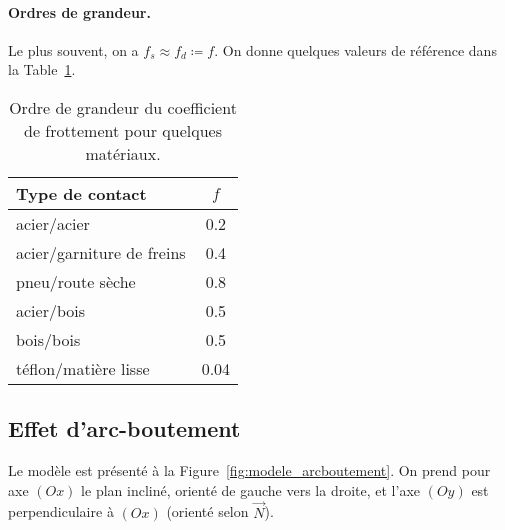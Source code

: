         \paragraph{Ordres de grandeur.} Le plus souvent, on a $f_s\approx f_d\coloneqq f$. On donne quelques valeurs de référence dans la Table~\ref{tab:odg_frottement_materiau}.

        \begin{table}
            \centering
            \begin{tabular}{l|c}
                \toprule
                Type de contact & $f$ \\ \midrule
                acier/acier & 0.2\\ \midrule
                acier/garniture de freins & 0.4\\ \midrule
                pneu/route sèche & 0.8\\ \midrule
                acier/bois & 0.5\\ \midrule
                bois/bois & 0.5\\ \midrule
                téflon/matière lisse & 0.04\\ \bottomrule
            \end{tabular}    
            \caption{Ordre de grandeur du coefficient de frottement pour quelques matériaux.}
            \label{tab:odg_frottement_materiau}
        \end{table}
    
    \subsection{Effet d'arc-boutement}
        
        Le modèle est présenté à la Figure~\ref{fig:modele_arcboutement}. On prend pour axe $(Ox)$ le plan incliné, orienté de gauche vers la droite, et l'axe $(Oy)$ est perpendiculaire à $(Ox)$ (orienté selon $\vec{N}$).

